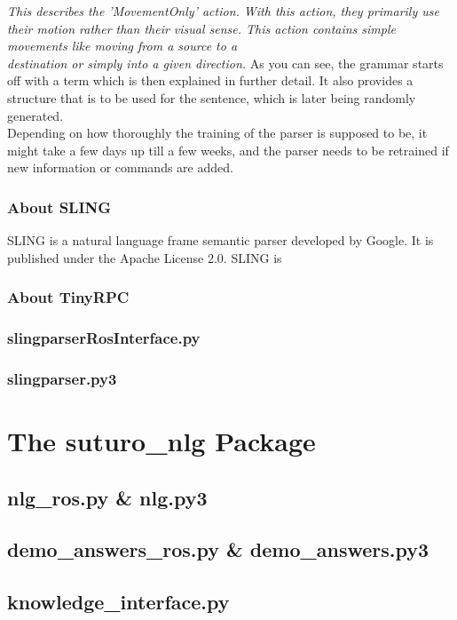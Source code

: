\documentclass[main.tex]{subfiles}
\begin{document}
            \textit{This describes the 'MovementOnly' action.
                With this action, they primarily use their motion rather than their visual sense. This action contains simple movements like moving from a source to a\\ destination or simply into a given direction.}            
            As you can see, the grammar starts off with a term which is then explained in further detail. It also provides a structure that is to be used for the sentence, which is later being randomly generated.\\ 
            Depending on how thoroughly the training of the parser is supposed to be, it might take a few days up till a few weeks, and the parser needs to be retrained if new information or commands are added.
        
        \subsubsection{About SLING}
            SLING is a natural language frame semantic parser developed by Google. It is published under the Apache License 2.0. SLING is  
        \subsubsection{About TinyRPC}
        \subsubsection{slingparserRosInterface.py}
        \subsubsection{slingparser.py3}
    
    
\section{The suturo\_nlg Package}
    \subsection{nlg\_ros.py \& nlg.py3}
    \subsection{demo\_answers\_ros.py \& demo\_answers.py3}
    \subsection{knowledge\_interface.py}
    
\end{document}
